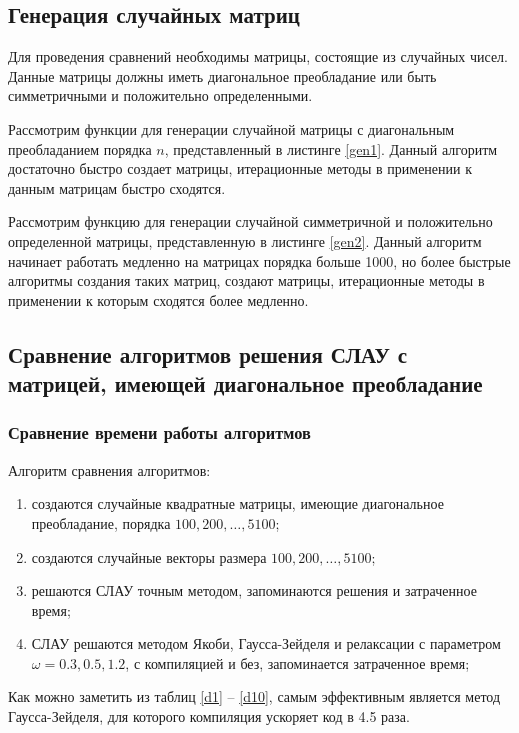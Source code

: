 \documentclass[14pt]{extarticle}
\begin{document}
\subsection{Генерация случайных матриц}
Для проведения сравнений необходимы матрицы, состоящие из случайных чисел.
Данные матрицы должны иметь диагональное преобладание или
быть симметричными и положительно определенными.

Рассмотрим функции для генерации случайной матрицы с диагональным преобладанием порядка $n$, представленный в листинге \ref{gen1}.
Данный алгоритм достаточно быстро создает матрицы, итерационные методы в применении
к данным матрицам быстро сходятся.


Рассмотрим функцию для генерации случайной 
симметричной и положительно определенной матрицы, представленную в листинге \ref{gen2}.
Данный алгоритм начинает работать медленно на матрицах порядка больше 1000,
но более быстрые алгоритмы создания таких матриц,
создают матрицы, итерационные методы в применении к которым сходятся 
более медленно.

\subsection{Сравнение алгоритмов решения СЛАУ с матрицей, имеющей диагональное преобладание}\label{diag}
\subsubsection{Сравнение времени работы алгоритмов}
Алгоритм сравнения алгоритмов:
\begin{enumerate}
    \item создаются случайные квадратные матрицы, имеющие диагональное преобладание, порядка $100,200,\dots,5100$;
    \item  создаются случайные векторы размера $100,200,\dots,5100$;
    \item решаются СЛАУ точным методом, запоминаются решения и затраченное время;
    \item СЛАУ решаются методом Якоби, Гаусса-Зейделя и релаксации с параметром $\omega = 0.3,0.5,1.2$, с компиляцией и без, запоминается затраченное время;
\end{enumerate}
Как можно заметить из таблиц \ref{d1} -- \ref{d10}, самым эффективным является метод Гаусса-Зейделя,
для которого компиляция ускоряет код в 4.5 раза.










\end{document}
